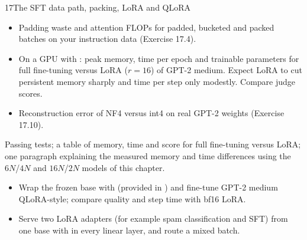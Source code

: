 \begin{labbox}{17}{The SFT data path, packing, LoRA and QLoRA}
\begin{itemize}
\item Padding waste and attention FLOPs for padded, bucketed and packed batches on your
instruction data (Exercise 17.4).
\item On a GPU with : peak memory, time per epoch and trainable parameters
for full fine-tuning versus LoRA ($r=16$) of GPT-2 medium. Expect LoRA to cut
persistent memory sharply and time per step only modestly. Compare judge scores.
\item Reconstruction error of NF4 versus int4 on real GPT-2 weights (Exercise 17.10).
\end{itemize}

Passing tests; a table of memory, time and score for full fine-tuning versus LoRA; one
paragraph explaining the measured memory and time differences using the $6N$/$4N$ and
$16N$/$2N$ models of this chapter.

\begin{itemize}
\item Wrap the frozen base with  (provided in )
and fine-tune GPT-2 medium QLoRA-style; compare quality and step time with bf16 LoRA.
\item Serve two LoRA adapters (for example spam classification and SFT) from one base
with  in every linear layer, and route a mixed batch.
\end{itemize}
\end{labbox}
